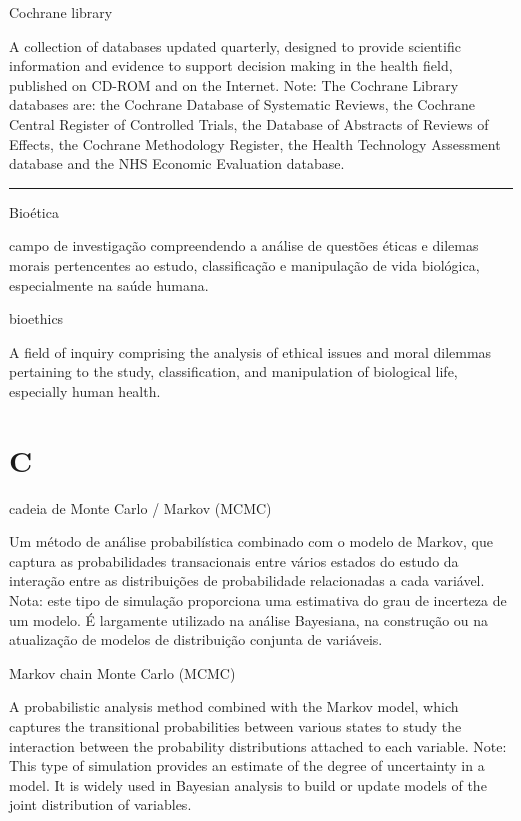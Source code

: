 \documentclass[
]{book}
\begin{document}
Cochrane library

A collection of databases updated quarterly, designed to provide scientific information and evidence to support decision making in the health field, published on CD-ROM and on the Internet. Note: The Cochrane Library databases are: the Cochrane Database of Systematic Reviews, the Cochrane Central Register of Controlled Trials, the Database of Abstracts of Reviews of Effects, the Cochrane Methodology Register, the Health Technology Assessment database and the NHS Economic Evaluation database.

\begin{center}\rule{0.5\linewidth}{0.5pt}\end{center}

Bioética

campo de investigação compreendendo a análise de questões éticas e dilemas morais pertencentes ao estudo, classificação e manipulação de vida biológica, especialmente na saúde humana.

bioethics

A field of inquiry comprising the analysis of ethical issues and moral dilemmas pertaining to the study, classification, and manipulation of biological life, especially human health.

\hypertarget{c}{%
\chapter*{C}\label{c}}

cadeia de Monte Carlo / Markov (MCMC)

Um método de análise probabilística combinado com o modelo de Markov, que captura as probabilidades transacionais entre vários estados do estudo da interação entre as distribuições de probabilidade relacionadas a cada variável. Nota: este tipo de simulação proporciona uma estimativa do grau de incerteza de um modelo. É largamente utilizado na análise Bayesiana, na construção ou na atualização de modelos de distribuição conjunta de variáveis.

Markov chain Monte Carlo (MCMC)

A probabilistic analysis method combined with the Markov model, which captures the transitional probabilities between various states to study the interaction between the probability distributions attached to each variable. Note: This type of simulation provides an estimate of the degree of uncertainty in a model. It is widely used in Bayesian analysis to build or update models of the joint distribution of variables.
\end{document}
